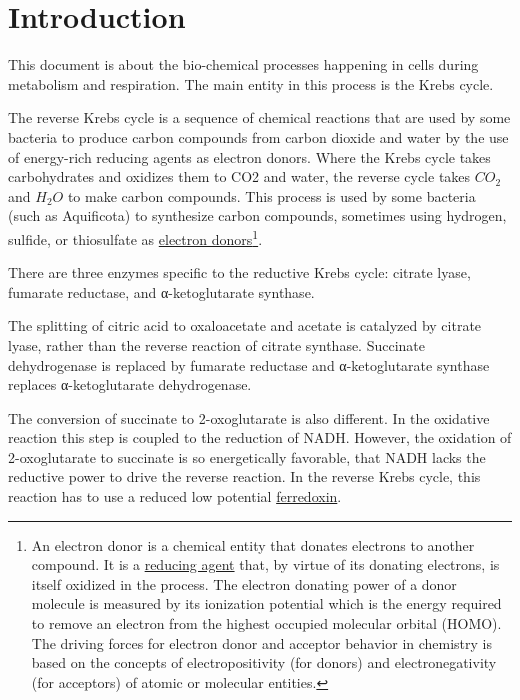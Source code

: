 \documentclass{article}
\begin{document}

\section{Introduction}

This document is about the bio-chemical processes happening in cells during metabolism and
respiration. The main entity in this process is the Krebs cycle.

The reverse Krebs cycle is a sequence of chemical reactions that are used by some bacteria
to produce carbon compounds from carbon dioxide and water by the use of energy-rich
reducing agents as electron donors.  Where the Krebs cycle takes carbohydrates and
oxidizes them to CO2 and water, the reverse cycle takes $CO_2$ and $H_2O$ to make carbon
compounds. This process is used by some bacteria (such as Aquificota) to synthesize carbon
compounds, sometimes using hydrogen, sulfide, or thiosulfate as
\href{https://en.wikipedia.org/wiki/Electron_donor}{electron donors}\footnote{An
electron donor is a chemical entity that donates electrons to another compound. It is a
\href{https://en.wikipedia.org/wiki/Reducing_agent}{reducing agent} that, by virtue of
its donating electrons, is itself oxidized in the
process. The electron donating power of a donor molecule is measured by its ionization
potential which is the energy required to remove an electron from the highest occupied
molecular orbital (HOMO). The driving forces for electron donor and acceptor behavior in
chemistry is based on the concepts of electropositivity (for donors) and electronegativity
(for acceptors) of atomic or molecular entities.}.

There are three enzymes specific to the reductive Krebs cycle: citrate lyase,
fumarate reductase, and α-ketoglutarate synthase.

The splitting of citric acid to oxaloacetate and acetate is catalyzed by citrate lyase,
rather than the reverse reaction of citrate synthase. Succinate dehydrogenase is
replaced by fumarate reductase and α-ketoglutarate synthase replaces α-ketoglutarate
dehydrogenase.

The conversion of succinate to 2-oxoglutarate is also different. In the oxidative reaction
this step is coupled to the reduction of NADH\@. However, the oxidation of 2-oxoglutarate to
succinate is so energetically favorable, that NADH lacks the reductive power to drive the
reverse reaction. In the reverse Krebs cycle, this reaction has to use a reduced low potential
\href{https://en.wikipedia.org/wiki/Ferredoxin}{ferredoxin}.
\end{document}
